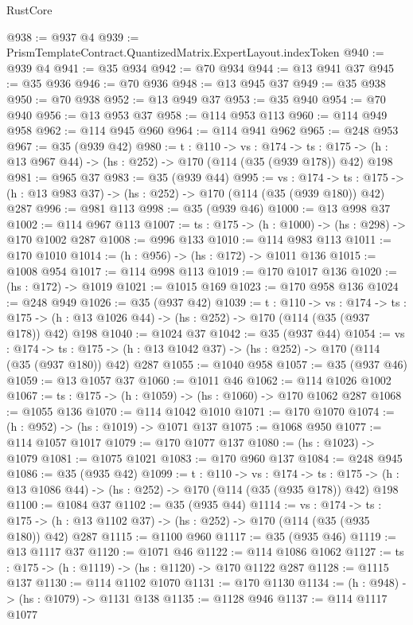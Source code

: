 \begin{lexlean}{RustCore}
\begin{coremodule}
@938 := @937 @4
@939 := PrismTemplateContract.QuantizedMatrix.ExpertLayout.indexToken
@940 := @939 @4
@941 := @35 @934
@942 := @70 @934
@944 := @13 @941 @37
@945 := @35 @936
@946 := @70 @936
@948 := @13 @945 @37
@949 := @35 @938
@950 := @70 @938
@952 := @13 @949 @37
@953 := @35 @940
@954 := @70 @940
@956 := @13 @953 @37
@958 := @114 @953 @113
@960 := @114 @949 @958
@962 := @114 @945 @960
@964 := @114 @941 @962
@965 := @248 @953
@967 := @35 (@939 @42)
@980 := {t : @110} ->
  {vs : @174} ->
  {ts : @175} -> (h : @13 @967 @44) -> (hs : @252) -> @170 (@114 (@35 (@939 @178)) @42) @198
@981 := @965 @37
@983 := @35 (@939 @44)
@995 := {vs : @174} ->
  {ts : @175} -> (h : @13 @983 @37) -> (hs : @252) -> @170 (@114 (@35 (@939 @180)) @42) @287
@996 := @981 @113
@998 := @35 (@939 @46)
@1000 := @13 @998 @37
@1002 := @114 @967 @113
@1007 := {ts : @175} -> (h : @1000) -> (hs : @298) -> @170 @1002 @287
@1008 := @996 @133
@1010 := @114 @983 @113
@1011 := @170 @1010
@1014 := (h : @956) -> (hs : @172) -> @1011 @136
@1015 := @1008 @954
@1017 := @114 @998 @113
@1019 := @170 @1017 @136
@1020 := (hs : @172) -> @1019
@1021 := @1015 @169
@1023 := @170 @958 @136
@1024 := @248 @949
@1026 := @35 (@937 @42)
@1039 := {t : @110} ->
  {vs : @174} ->
  {ts : @175} -> (h : @13 @1026 @44) -> (hs : @252) -> @170 (@114 (@35 (@937 @178)) @42) @198
@1040 := @1024 @37
@1042 := @35 (@937 @44)
@1054 := {vs : @174} ->
  {ts : @175} -> (h : @13 @1042 @37) -> (hs : @252) -> @170 (@114 (@35 (@937 @180)) @42) @287
@1055 := @1040 @958
@1057 := @35 (@937 @46)
@1059 := @13 @1057 @37
@1060 := @1011 @46
@1062 := @114 @1026 @1002
@1067 := {ts : @175} -> (h : @1059) -> (hs : @1060) -> @170 @1062 @287
@1068 := @1055 @136
@1070 := @114 @1042 @1010
@1071 := @170 @1070
@1074 := (h : @952) -> (hs : @1019) -> @1071 @137
@1075 := @1068 @950
@1077 := @114 @1057 @1017
@1079 := @170 @1077 @137
@1080 := (hs : @1023) -> @1079
@1081 := @1075 @1021
@1083 := @170 @960 @137
@1084 := @248 @945
@1086 := @35 (@935 @42)
@1099 := {t : @110} ->
  {vs : @174} ->
  {ts : @175} -> (h : @13 @1086 @44) -> (hs : @252) -> @170 (@114 (@35 (@935 @178)) @42) @198
@1100 := @1084 @37
@1102 := @35 (@935 @44)
@1114 := {vs : @174} ->
  {ts : @175} -> (h : @13 @1102 @37) -> (hs : @252) -> @170 (@114 (@35 (@935 @180)) @42) @287
@1115 := @1100 @960
@1117 := @35 (@935 @46)
@1119 := @13 @1117 @37
@1120 := @1071 @46
@1122 := @114 @1086 @1062
@1127 := {ts : @175} -> (h : @1119) -> (hs : @1120) -> @170 @1122 @287
@1128 := @1115 @137
@1130 := @114 @1102 @1070
@1131 := @170 @1130
@1134 := (h : @948) -> (hs : @1079) -> @1131 @138
@1135 := @1128 @946
@1137 := @114 @1117 @1077

\end{coremodule}
\end{lexlean}
